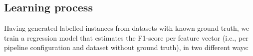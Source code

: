\subsection{Learning process}
\label{sec:learningProcess}

%

Having generated labelled instances from datasets with known ground truth, we train a regression model that estimates the F1-score per feature vector (i.e., per pipeline configuration and dataset without ground truth), in two different ways:
